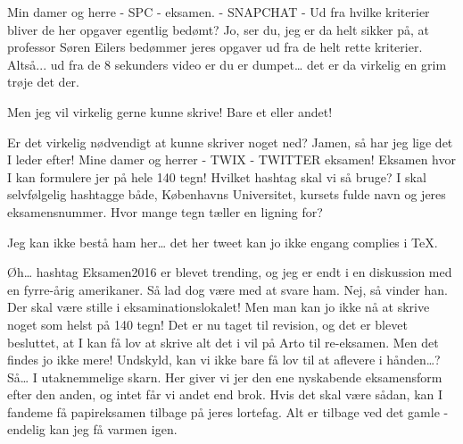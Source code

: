 \documentclass[a4paper,11pt]{article}
\begin{document}
\begin{sketch}
 Min damer og herre - SPC - eksamen. - SNAPCHAT - 
 Ud fra hvilke kriterier bliver de her opgaver egentlig bedømt?
 Jo, ser du, jeg er da helt sikker på, at professor Søren Eilers bedømmer jeres opgaver ud fra de helt rette kriterier.
  Altså... ud fra de 8 sekunders video er du er dumpet… det er da virkelig en grim trøje det der.

 Men jeg vil virkelig gerne kunne skrive! Bare et eller andet!

 Er det virkelig nødvendigt at kunne skriver noget ned? Jamen, så har jeg lige det I leder efter! Mine damer og herrer - TWIX - TWITTER eksamen! Eksamen hvor I kan formulere jer på hele 140 tegn!
 Hvilket hashtag skal vi så bruge?
 I skal selvfølgelig hashtagge både, Københavns Universitet, kursets fulde navn og jeres eksamensnummer.
 Hvor mange tegn tæller en ligning for?

 Jeg kan ikke bestå ham her… det her tweet kan jo ikke engang complies i TeX.

 Øh… hashtag Eksamen2016 er blevet trending, og jeg er endt i en diskussion med en fyrre-årig amerikaner.
 Så lad dog være med at svare ham.
 Nej, så vinder han.
 Der skal være stille i eksaminationslokalet!
 Men man kan jo ikke nå at skrive noget som helst på 140 tegn!
 Det er nu taget til revision, og det er blevet besluttet, at I kan få lov at skrive alt det i vil på Arto til re-eksamen.
 Men det findes jo ikke mere!
 Undskyld, kan vi ikke bare få lov til at aflevere i hånden…?
 Så… I utaknemmelige skarn. Her giver vi jer den ene nyskabende eksamensform efter den anden, og intet får vi andet end brok. Hvis det skal være sådan, kan I fandeme få papireksamen tilbage på jeres lortefag.
 Alt er tilbage ved det gamle - endelig kan jeg få varmen igen. 


\end{sketch}
\end{document}
